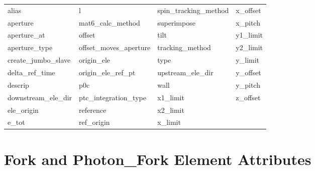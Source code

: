  \begin{tabular}{llll} \toprule
alias                       & l                           & spin_tracking_method        & x_offset                    \\
aperture                    & mat6_calc_method            & superimpose                 & x_pitch                     \\
aperture_at                 & offset                      & tilt                        & y1_limit                    \\
aperture_type               & offset_moves_aperture       & tracking_method             & y2_limit                    \\
create_jumbo_slave          & origin_ele                  & type                        & y_limit                     \\
delta_ref_time              & origin_ele_ref_pt           & upstream_ele_dir            & y_offset                    \\
descrip                     & p0c                         & wall                        & y_pitch                     \\
downstream_ele_dir          & ptc_integration_type        & x1_limit                    & z_offset                    \\
ele_origin                  & reference                   & x2_limit                    &                             \\
e_tot                       & ref_origin                  & x_limit                     &                             \\
 \bottomrule
 \end{tabular}
 \vfill
 
 \section{Fork and Photon_Fork Element Attributes}
 \label{s:list.fork}
 
